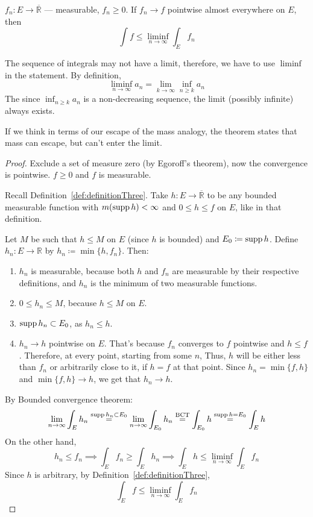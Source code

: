 \begin{lemma}
    \label{lem:fatou}
    $f_n : E \to \overline{\mathbb{R}}$ --- measurable, $f_n \ge 0$.
    If $f_n \to f$ pointwise almost everywhere on $E$, then
    \[
        \int f \le \liminf_{n \to \infty} \int_E f_n 
    \]
\end{lemma}
\begin{remark}
    The sequence of integrals may not have a limit, therefore, we have to use
    $\liminf$ in the statement. By definition,
    \[ \liminf_{n \to \infty} a_n = \lim_{k \to \infty} \inf_{n \ge k} a_n \]
    The since $\inf_{n \ge k} a_n$ is a non-decreasing sequence, the limit
    (possibly infinite) always exists.
\end{remark}
\begin{remark}
    If we think in terms of our escape of the mass analogy, the theorem states that mass can escape,
    but can't enter the limit.
\end{remark}
\begin{proof}
    Exclude a set of measure zero (by Egoroff's theorem), now the convergence is pointwise.
    $f \ge 0$ and $f$ is measurable.

    Recall Definition~\ref{def:definitionThree}.
    Take $h : E \to \overline{\mathbb{R}}$ to be any bounded measurable function with 
    $m(\operatorname{supp} h) < \infty$ and $0 \le h \le f$ on $E$, like in that definition.

    Let $M$ be such that $h \le M$ on $E$ (since $h$ is bounded) and $E_0 \coloneqq \operatorname{supp} h$.
    Define $h_n : E \to \mathbb{R}$ by $h_n \coloneqq \min\{h, f_n\}$. Then:
    \begin{enumerate}
        \item {
            $h_n$ is measurable, because both $h$ and $f_n$ are measurable by their
            respective definitions, and $h_n$ is the minimum of two measurable functions.
        }
        \item {
            $0 \le h_n \le M$, because $h \le M$ on $E$.
        }
        \item {
            $\operatorname{supp} h_n \subset E_0$, as $h_n \le h$.
        }
        \item {
            $h_n \to h$ pointwise on $E$. That's because $f_n$ converges to $f$ pointwise
            and $h \le f$. Therefore, at every point, starting from some $n$, 
            Thus, $h$ will be either less than $f_n$ or arbitrarily close to it, if
            $h = f$ at that point. Since $h_n = \min\{f, h\}$ and 
            $\min\{f, h\} \to h$, we get that $h_n \to h$.
        }
    \end{enumerate}
    By Bounded convergence theorem:
    \[ 
        \lim_{n \to \infty} \int_E h_n 
        \overset{\operatorname{supp} h_n \subset E_0}{=} \lim_{n \to \infty} \int_{E_0} h_n
        \overset{\text{BCT}}{=}
        \int_{E_0} h \overset{\operatorname{supp} h = E_0}{=} \int_E h
    \]
    On the other hand,
    \[
        h_n \le f_n \implies \int_E f_n \ge \int_E h_n \implies
        \int_E h \le \liminf_{n \to \infty} \int_E f_n
    \]
    Since $h$ is arbitrary, by Definition~\ref{def:definitionThree},
    \[
        \int_E f \le \liminf_{n \to \infty} \int_E f_n
    \]
\end{proof}

